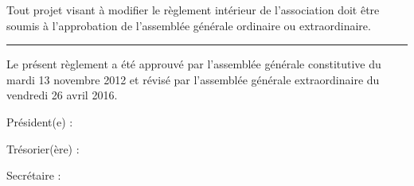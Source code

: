 \documentclass[a4paper, 11pt]{article}
\newcommand{\dateAGC}{mardi 13 novembre 2012}
\newcommand{\dateAGE}{vendredi 26 avril 2016}
\newcommand\sep{\noindent\rule{\linewidth}{.5pt}}
\begin{document}
Tout projet visant à modifier le règlement intérieur de l'association doit être soumis à l'approbation de l'assemblée
générale ordinaire ou extraordinaire.

\bigskip\bigskip

\sep

\bigskip\bigskip

Le présent règlement a été approuvé par l'assemblée générale constitutive du \dateAGC{} et révisé par l'assemblée générale extraordinaire du \dateAGE{}.

\bigskip\bigskip

Président(e) :

\bigskip\bigskip

Trésorier(ère) :

\bigskip\bigskip

Secrétaire :
\end{document}
